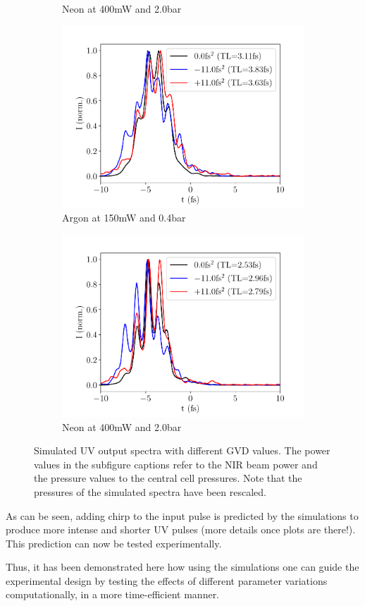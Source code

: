 \documentclass[a4paper]{jpconf}
\begin{document}
\begin{figure}[h]
\begin{subfigure}{0.49\textwidth}
\caption{Neon at 400mW and 2.0bar}\label{im:chirp_Ne}
\end{subfigure}
\begin{subfigure}{0.49\textwidth}
\includegraphics[width=\textwidth]{im/temporal_Ar_chirp}
\caption{Argon at 150mW and 0.4bar}\label{im:chirp_Ar_temp}
\end{subfigure}
\begin{subfigure}{0.49\textwidth}
\includegraphics[width=\textwidth]{im/temporal_Ne_chirp}
\caption{Neon at 400mW and 2.0bar}\label{im:chirp_Ne_temp}
\end{subfigure}
\caption{Simulated UV output spectra with different GVD values. The power values in the subfigure captions refer to the NIR beam power and the pressure values to the central cell pressures. Note that the pressures of the simulated spectra have been rescaled.}\label{im:chirp}
\end{figure}
As can be seen, adding chirp to the input pulse is predicted by the simulations to produce more intense and shorter UV pulses (more details once plots are there!). This prediction can now be tested experimentally. \par 
Thus, it has been demonstrated here how using the simulations one can guide the experimental design by testing the effects of different parameter variations computationally, in a more time-efficient manner. 
\end{document}
